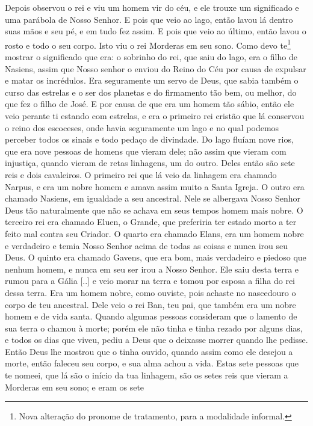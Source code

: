 Depois observou o rei e viu um homem vir do céu, e ele trouxe um significado
e uma parábola de Nosso Senhor. E pois que veio ao lago, então lavou lá dentro
suas mãos e seu pé,  e em tudo fez assim. E pois que veio ao último, então
lavou o rosto e todo o seu corpo. Isto viu o rei Morderas em seu sono. Como
devo te\footnote{ Nova alteração do pronome de tratamento, para a modalidade
informal.}  mostrar o significado que era: o sobrinho do rei, que
saiu do lago, era o filho de Nasiens, assim que Nosso senhor o enviou do Reino
do Céu por causa de expulsar e matar os incrédulos. Era seguramente um servo de
Deus, que sabia também o curso das estrelas e o ser dos planetas e do
firmamento tão bem, ou melhor, do que fez o filho de José. E por causa de que
era um homem tão sábio, então ele veio perante ti estando com estrelas, e era o
primeiro rei cristão que lá conservou o reino dos escoceses, onde havia
seguramente um lago e no qual podemos perceber todos os sinais e todo pedaço de
divindade. Do lago fluíam nove rios, que era nove pessoas de homens que vieram
dele; não assim que vieram com injustiça, quando vieram de retas linhagens, um
do outro. Deles então são sete reis e dois cavaleiros. O primeiro rei que lá
veio da linhagem era chamado Narpus, e era um nobre homem e amava assim muito a
Santa Igreja. O outro era chamado Nasiens, em igualdade a seu ancestral. Nele
se albergava Nosso Senhor Deus tão naturalmente que não se achava em seus
tempos homem mais nobre. O terceiro rei era chamado Eluen, o Grande, que
preferiria ter estado morto a ter feito mal contra seu Criador. O quarto era
chamado Elans, era um homem nobre e verdadeiro e temia Nosso Senhor acima de
todas as coisas e nunca irou seu Deus. O quinto era chamado Gavens, que era
bom, mais verdadeiro e piedoso que nenhum homem, e nunca em seu ser irou a
Nosso Senhor. Ele saiu desta terra e rumou para a Gália [..] e veio morar na
terra e tomou por esposa a filha do rei dessa terra. Era um homem nobre, como
ouviste, pois achaste no nascedouro o corpo de teu ancestral. Dele veio o rei
Ban, teu pai, que também era um nobre homem e de vida santa. Quando algumas
pessoas consideram que o lamento de sua terra o chamou à morte; porém ele não
tinha e tinha rezado por alguns dias, e todos os dias que viveu, pediu a Deus
que o deixasse morrer quando lhe pedisse. Então Deus lhe mostrou que o tinha
ouvido, quando assim como ele desejou a morte, então faleceu seu corpo, e sua
alma achou a vida. Estas sete pessoas que te nomeei, que lá são o início da tua
linhagem, são os setes reis que vieram a Morderas em seu sono; e eram os sete
